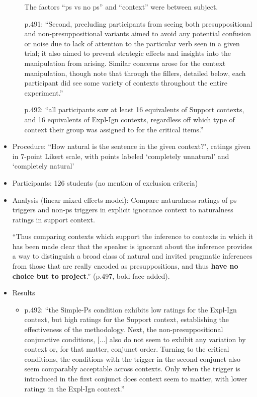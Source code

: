 \documentclass[11pt,fleqn]{article}
\newcommand{\6}{\mbox{$[\hspace*{-.6mm}[$}}
\newcommand{\9}{\mbox{$]\hspace*{-.6mm}]$}}
\begin{document}
\begin{itemize}
\begin{itemize}
The factors ``ps vs no ps'' and ``context'' were between subject.

p.491: ``Second, precluding participants from seeing both presuppositional and non-presuppositional variants aimed to avoid any potential confusion or noise due to lack of attention to the particular verb seen in a given trial; it also aimed to prevent strategic effects and insights into the manipulation from arising. Similar concerns arose for the context manipulation, though note that through the fillers, detailed below, each participant did see some variety of contexts throughout the entire experiment.''

p.492: ``all participants saw at least 16 equivalents of Support contexts, and 16 equivalents of Expl-Ign contexts, regardless off which type of context their group was assigned to for the critical items.''


\end{itemize}

\item Procedure: ``How natural is the sentence in the given context?", ratings given in 7-point Likert scale, with points labeled `completely unnatural' and `completely natural'

\item Participants: 126 students (no mention of exclusion criteria)

\item Analysis (linear mixed effects model): Compare naturalness ratings of ps triggers and non-ps triggers in explicit ignorance context to naturalness ratings in support context.

``Thus comparing contexts which support the inference to contexts in which it has been made clear that the speaker is ignorant about the inference provides a way to distinguish a broad class of natural and invited pragmatic inferences from those that are really encoded as presuppositions, and thus {\bf have no choice but to project}.'' (p.497, bold-face added).

\item Results

\begin{itemize}

\item p.492: ``the Simple-Ps condition exhibits low ratings for the Expl-Ign context, but high ratings for the Support context, establishing the effectiveness of the methodology. Next, the non-presuppositional conjunctive conditions, [...] also do not seem to exhibit any variation by context or, for that matter, conjunct order. Turning to the critical conditions, the conditions with the trigger in the second conjunct also seem comparably acceptable across contexts. Only when the trigger is introduced in the first conjunct does context seem to matter, with lower ratings in the Expl-Ign context.''


\end{itemize}
\end{itemize}
\end{document}

